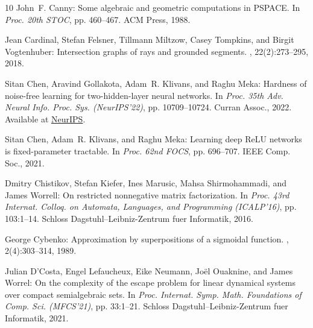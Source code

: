 \begin{thebibliography}{10}
{\sc John~F. Canny}: Some algebraic and geometric computations in {PSPACE}.
\newblock In {\em Proc. 20th STOC}, pp. 460--467. ACM Press, 1988.
\newblock [\epfmtdoi{10.1145/62212.62257}]

{\sc Jean Cardinal, Stefan Felsner, Tillmann Miltzow, Casey Tompkins, and
  Birgit Vogtenhuber}: Intersection graphs of rays and grounded segments.
, 22(2):273--295, 2018.

{\sc Sitan Chen, Aravind Gollakota, Adam~R. Klivans, and Raghu Meka}: Hardness
  of noise-free learning for two-hidden-layer neural networks.
\newblock In {\em Proc. 35th Adv. Neural Info. Proc. Sys. (NeurIPS'22)}, pp.
  10709--10724. Curran Assoc., 2022.
\newblock Available at
  \href{https://papers.nips.cc/paper_files/paper/2022/hash/45a7ca247462d9e465ee88c8a302ca70-Abstract-Conference.html}{NeurIPS}.

{\sc Sitan Chen, Adam~R. Klivans, and Raghu Meka}: Learning deep {ReLU}
  networks is fixed-parameter tractable.
\newblock In {\em Proc. 62nd FOCS}, pp. 696--707. IEEE Comp. Soc., 2021.

{\sc Dmitry Chistikov, Stefan Kiefer, Ines Marusic, Mahsa Shirmohammadi, and
  James Worrell}: On restricted nonnegative matrix factorization.
\newblock In {\em Proc. 43rd Internat. Colloq. on Automata, Languages, and
  Programming (ICALP'16)}, pp. 103:1--14. Schloss Dagstuhl--Leibniz-Zentrum
  fuer Informatik, 2016.

{\sc George Cybenko}: Approximation by superpositions of a sigmoidal function.
, 2(4):303--314, 1989.
\newblock [\epfmtdoi{10.1007/BF02551274}]

{\sc Julian D'Costa, Engel Lefaucheux, Eike Neumann, Jo{\"{e}}l Ouaknine, and
  James Worrel}: On the complexity of the escape problem for linear dynamical
  systems over compact semialgebraic sets.
\newblock In {\em Proc. Internat. Symp. Math. Foundations of Comp. Sci.
  (MFCS'21)}, pp. 33:1--21. Schloss Dagstuhl--Leibniz-Zentrum fuer Informatik,
  2021.


\end{thebibliography}

